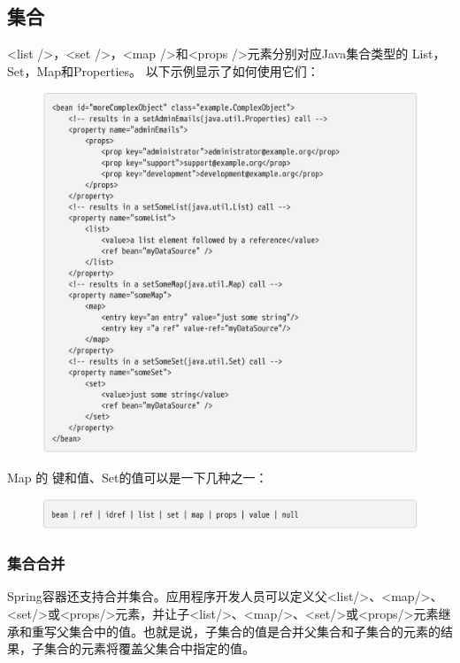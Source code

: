 \newpage
\subsection{集合}
<list />，<set />，<map />和<props />元素分别对应Java集合类型的
List，Set，Map和Properties。 以下示例显示了如何使用它们：

\begin{figure}[ht]
    \centering
    \includegraphics[width=1\linewidth]{./Figure/IMG_code_41.png}
\end{figure}

Map 的 键和值、Set的值可以是一下几种之一：

\begin{figure}[ht]
    \centering
    \includegraphics[width=1\linewidth]{./Figure/IMG_code_42.png}
\end{figure}

\subsubsection{集合合并}
Spring容器还支持合并集合。应用程序开发人员可以定义父<list/>、<map/>、<set/>或<props/>元素，并让子<list/>、<map/>、<set/>或<props/>元素继承和重写父集合中的值。也就是说，子集合的值是合并父集合和子集合的元素的结果，子集合的元素将覆盖父集合中指定的值。


